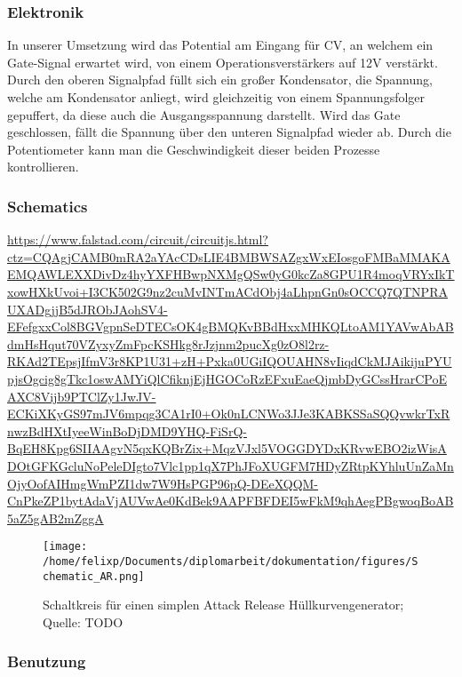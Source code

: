 \subsubsection{Elektronik}
\label{sec:org0512921}
In unserer Umsetzung wird das Potential am Eingang für \acl{CV}, an welchem ein Gate-Signal erwartet wird, von einem Operationsverstärkers auf 12V verstärkt. Durch den oberen Signalpfad füllt sich ein großer Kondensator, die Spannung, welche am Kondensator anliegt, wird gleichzeitig von einem Spannungsfolger gepuffert, da diese auch die Ausgangsspannung darstellt. Wird das Gate geschlossen, fällt die Spannung über den unteren Signalpfad wieder ab. Durch die Potentiometer kann man die Geschwindigkeit dieser beiden Prozesse kontrollieren.
\subsubsection{Schematics}
\label{sec:org005337d}
\url{https://www.falstad.com/circuit/circuitjs.html?ctz=CQAgjCAMB0mRA2aYAcCDsLIE4BMBWSAZgxWxEIosgoFMBaMMAKAEMQAWLEXXDivDz4hyYXFHBwpNXMgQSw0yG0kcZa8GPU1R4moqVRYxIkTxowHXkUvoi+I3CK502G9nz2cuMvINTmACdObj4aLhpnGn0sOCCQ7QTNPRAUXADgjjB5dJRObJAohSV4-EFefgxxCol8BGVgpnSeDTECsOK4gBMQKvBBdHxxMHKQLtoAM1YAVwAbABdmHsHqut70VZyxyZmFpcKSHkg8rJzjnm2pucXg0zO8l2rz-RKAd2TEpsjIfmV3r8KP1U31+zH+Pxka0UGiIQOUAHN8vIiqdCkMJAikijuPYUpjsOgcig8gTkc1oswAMYiQlCfiknjEjHGOCoRzEFxuEaeQjmbDyGCssHrarCPoEAXC8Vijb9PTClZy1JwJV-ECKiXKyGS97mJV6mpqg3CA1rI0+Ok0nLCNWo3JJe3KABKSSaSQQvwkrTxRnwzBdHXtIyeeWinBoDjDMD9YHQ-FiSrQ-BqEH8Kpg6SIIAAgvN5qxKQBrZix+MqzVJxl5VOGGDYDxKRvwEBO2izWisADOtGFKGcluNoPeleDIgto7Vlc1pp1qX7PhJFoXUGFM7HDyZRtpKYhluUnZaMnOjyOofAIHmgWmPZI1dw7W9HsPGP96pQ-DEeXQQM-CnPkeZP1bytAdaVjAUVwAe0KdBek9AAPFBFDEI5wFkM9qhAegPBgwoqBoAB5aZ5gAB2mZggA}
\begin{figure}[htbp]
\centering
\texttt{[image: /home/felixp/Documents/diplomarbeit/dokumentation/figures/Schematic\_AR.png]}
\caption{Schaltkreis für einen simplen Attack Release Hüllkurvengenerator; Quelle: TODO}
\end{figure}
\subsubsection{Benutzung}
\label{sec:orgf5ef801}
